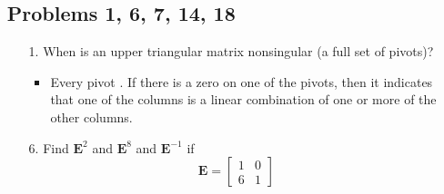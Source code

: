 \begin{itemize}
  \item []

    \subsection{Problems 1, 6, 7, 14, 18}
    \begin{itemize}\color{foreground-2}
      \item[1.] When is an upper triangular matrix nonsingular (a full set of
        pivots)?

      \begin{itemize}\color{foreground}
         \item Every pivot . If there is a zero on one of
           the pivots, then it indicates that one of the columns is a linear
           combination of one or more of the other columns.
      \end{itemize}

      \item[6.] Find \( \bm{E}^2 \) and \( \bm{E}^8 \) and \( \bm{E}^{-1} \) if
      \[%
      \bm{E} = \begin{bmatrix}
        1 & 0 \\
        6 & 1
      \end{bmatrix}
      \]%
      \fg{\[%
          \bm{E}^2 = \begin{bmatrix}
            1 & 0 \\
            36 & 1
          \end{bmatrix}\quad
          \bm{E}^8 =
          \begin{bmatrix}
            1 & 0 \\
            1679616 & 1
          \end{bmatrix}\quad
          \bm{E}^{-1} =
          \begin{bmatrix}
            1 & 0 \\
            -6 & 1
          \end{bmatrix}
      \]}%


\end{itemize}
\end{itemize}
